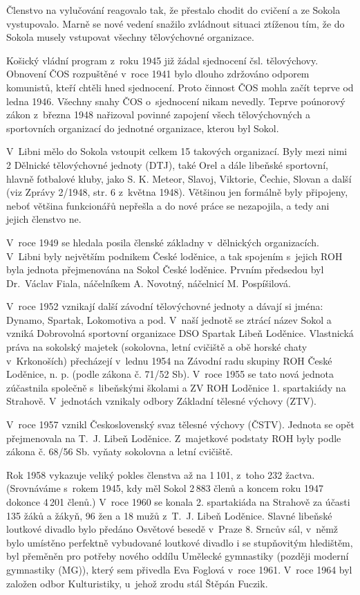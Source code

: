 \documentclass[a5paper, 11pt, twoside]{article}
\begin{document}
Členstvo na vylučování reagovalo tak, že přestalo chodit do cvičení a ze
Sokola vystupovalo. Marně se nové vedení snažilo zvládnout situaci
ztíženou tím, že do Sokola musely vstupovat všechny tělovýchovné
organizace.

Košický vládní program z~roku 1945 již žádal sjednocení čsl.
tělovýchovy. Obnovení ČOS rozpuštěné v~roce 1941 bylo dlouho zdržováno
odporem komunistů, kteří chtěli hned sjednocení. Proto činnost ČOS mohla
začít teprve od ledna 1946. Všechny snahy ČOS o~sjednocení nikam
nevedly. Teprve poúnorový zákon z~března 1948 nařizoval povinné zapojení
všech tělovýchovných a sportovních organizací do jednotné organizace,
kterou byl Sokol.

V~Libni mělo do Sokola vstoupit celkem 15 takových organizací. Byly mezi
nimi 2 Dělnické tělovýchovné jednoty (DTJ), také Orel a dále libeňské
sportovní, hlavně fotbalové kluby, jako S. K. Meteor, Slavoj, Viktorie,
Čechie, Slovan a další (viz Zprávy 2/1948, str. 6 z~května 1948).
Většinou jen formálně byly připojeny, neboť většina funkcionářů nepřešla
a do nové práce se nezapojila, a tedy ani jejich členstvo ne.

{\sloppy V~roce 1949 se hledala posila členské základny v~dělnických
organizacích. V~Libni byly největším podnikem České loděnice, a tak
spojením s~jejich ROH byla jednota přejmenována na Sokol České loděnice.
Prvním předsedou byl Dr.~Václav Fiala, náčelníkem A. Novotný, náčelnicí
M. Pospíšilová.\par}

V~roce 1952 vznikají další závodní tělovýchovné jednoty a dávají si
jména: Dynamo, Spartak, Lokomotiva a pod. V~naší jednotě se ztrácí název
Sokol a vzniká Dobrovolná sportovní organizace DSO Spartak Libeň
Loděnice. Vlastnická práva na sokolský majetek (sokolovna, letní
cvičiště a obě horské chaty v~Krkonoších) přecházejí v~lednu 1954 na
Závodní radu skupiny ROH České Loděnice, n. p. (podle zákona č. 71/52
Sb). V~roce 1955 se tato nová jednota zúčastnila společně s~libeňskými
školami a ZV ROH Loděnice 1. spartakiády na Strahově. V~jednotách
vznikaly odbory Základní tělesné výchovy (ZTV).

V~roce 1957 vznikl Československý svaz tělesné výchovy (ČSTV). Jednota
se opět přejmenovala na T.~J. Libeň Loděnice. Z~majetkové podstaty ROH
byly podle zákona č. 68/56 Sb. vyňaty sokolovna a letní cvičiště.

Rok 1958 vykazuje veliký pokles členstva až na 1\,101, z~toho 232 žactva.
(Srovnáváme s~rokem 1945, kdy měl Sokol 2\,883 členů a koncem roku 1947
dokonce 4\,201 členů.) V~roce 1960 se konala 2. spartakiáda na Strahově
za účasti 135 žáků a žákyň, 96 žen a 18 mužů z~T.~J. Libeň Loděnice.
Slavné libeňské loutkové divadlo bylo předáno Osvětové besedě v~Praze 8.
Srncův sál, v~němž bylo umístěno perfektně vybudované loutkové divadlo i
se stupňovitým hledištěm, byl přeměněn pro potřeby nového oddílu
Umělecké gymnastiky (později moderní gymnastiky (MG)), který sem
přivedla Eva Foglová v~roce 1961. V~roce 1964 byl založen odbor
Kulturistiky, u~jehož zrodu stál Štěpán Fuczik.
\end{document}
